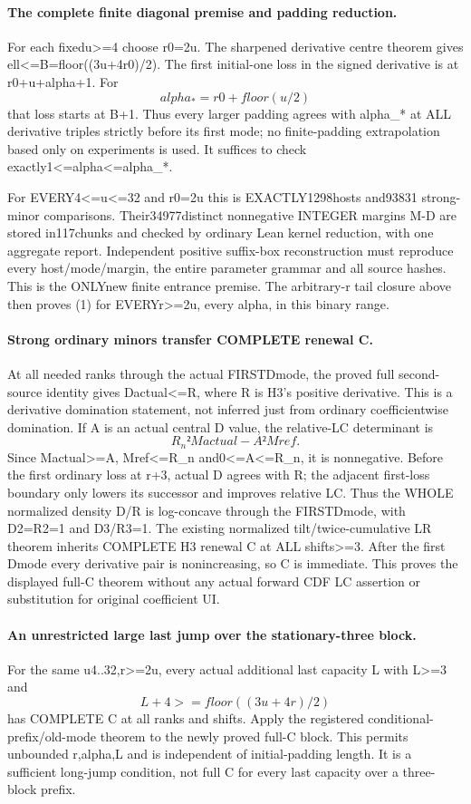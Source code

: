 \paragraph{The complete finite diagonal premise and padding reduction.}
For each fixedu>=4 choose r0=2u. The sharpened derivative centre
theorem gives ell<=B=floor((3u+4r0)/2). The first initial-one loss
in the signed derivative is at r0+u+alpha+1. For
\[
                     alpha_* = r0+floor(u/2)
\]
that loss starts at B+1. Thus every larger padding agrees with
alpha_* at ALL derivative triples strictly before its first mode;
no finite-padding extrapolation based only on experiments is used.
It suffices to check exactly1<=alpha<=alpha_*.

For EVERY4<=u<=32 and r0=2u this is EXACTLY1298hosts and93831
strong-minor comparisons. Their34977distinct nonnegative INTEGER
margins M-D are stored in117chunks and checked by ordinary Lean
kernel reduction, with one aggregate report. Independent positive
suffix-box reconstruction must reproduce every host/mode/margin,
the entire parameter grammar and all source hashes. This is the
ONLYnew finite entrance premise. The arbitrary-r tail closure above
then proves (1) for EVERYr>=2u, every alpha, in this binary range.

\paragraph{Strong ordinary minors transfer COMPLETE renewal C.}
At all needed ranks through the actual FIRSTDmode, the proved full
second-source identity gives Dactual<=R, where R is H3's positive
derivative. This is a derivative domination statement, not inferred
just from ordinary coefficientwise domination.
If A is an actual central D value, the relative-LC determinant is
\[
 R_n² Mactual-A² Mref.
\]
Since Mactual>=A, Mref<=R_n and0<=A<=R_n, it is nonnegative.
Before the first ordinary loss at r+3, actual D agrees with R;
the adjacent first-loss boundary only lowers its successor and
improves relative LC. Thus the WHOLE normalized density D/R
is log-concave through the FIRSTDmode, with D2=R2=1 and
D3/R3=1. The existing normalized tilt/twice-cumulative LR theorem
inherits COMPLETE H3 renewal C at ALL shifts>=3. After the first
Dmode every derivative pair is nonincreasing, so C is immediate.
This proves the displayed full-C theorem without any actual forward
CDF LC assertion or substitution for original coefficient UI.

\paragraph{An unrestricted large last jump over the stationary-three block.}
For the same u4..32,r>=2u, every actual additional last capacity L
with L>=3 and
\[
                    L+4>=floor((3u+4r)/2)
\]
has COMPLETE C at all ranks and shifts. Apply the registered
conditional-prefix/old-mode theorem to the newly proved full-C
block. This permits unbounded r,alpha,L and is independent of
initial-padding length. It is a sufficient long-jump condition,
not full C for every last capacity over a three-block prefix.

